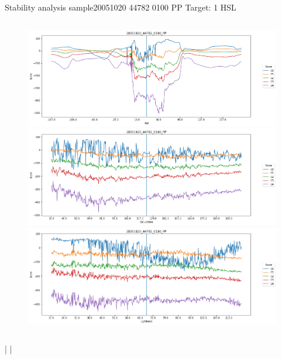 \documentclass{beamer}
\begin{document}
\begin{frame}{Stability analysis sample}{20051020 44782 0100 PP Target: 1 HSL}
\begin{columns}
\begin{column}{0.45\textwidth}
\begin{figure}[p]
			\includegraphics[width=\textwidth]{chapter_stability/20051020_44782_0100_PP/h/scores.png}			\includegraphics[width=\textwidth]{chapter_stability/20051020_44782_0100_PP/s/scores.png}			\includegraphics[width=\textwidth]{chapter_stability/20051020_44782_0100_PP/l/scores.png}
		\end{figure}
	\end{column}
\end{columns}
\href{run:videos_stability/Messidor_20051020_44782_0100_PP_Target_1_Checking_Hue_Sensitivity.mp4}{\color{blue}{Hue}} | \href{run:videos_stability/Messidor_20051020_44782_0100_PP_Target_1_Checking_Saturation_Sensitivity.mp4}{\color{blue}{Saturation}} | \href{run:videos_stability/Messidor_20051020_44782_0100_PP_Target_1_Checking_Luminance_Sensitivity.mp4}{\color{blue}{Lightness}}
\end{frame}
\end{document}
